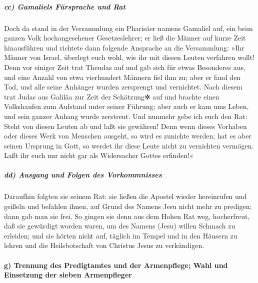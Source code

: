 \hypertarget{cc-gamaliels-fuxfcrsprache-und-rat}{%
\subparagraph{cc) Gamaliels Fürsprache und
Rat}\label{cc-gamaliels-fuxfcrsprache-und-rat}}

 Doch da stand in der Versammlung ein Pharisäer namens
Gamaliel auf, ein beim ganzen Volk hochangesehener Gesetzeslehrer; er
ließ die Männer auf kurze Zeit hinausführen  und richtete
dann folgende Ansprache an die Versammlung: »Ihr Männer von Israel,
überlegt euch wohl, wie ihr mit diesen Leuten verfahren wollt!
 Denn vor einiger Zeit trat Theudas auf und gab sich für
etwas Besonderes aus, und eine Anzahl von etwa vierhundert Männern fiel
ihm zu; aber er fand den Tod, und alle seine Anhänger wurden zersprengt
und vernichtet.  Nach diesem trat Judas aus Galiläa zur
Zeit der Schätzung✲ auf und brachte einen Volkshaufen zum Aufstand unter
seiner Führung; aber auch er kam ums Leben, und sein ganzer Anhang wurde
zerstreut.  Und nunmehr gebe ich euch den Rat: Steht von
diesen Leuten ab und laßt sie gewähren! Denn wenn dieses Vorhaben oder
dieses Werk von Menschen ausgeht, so wird es zunichte werden;
 hat es aber seinen Ursprung in Gott, so werdet ihr diese
Leute nicht zu vernichten vermögen. Laßt ihr euch nur nicht gar als
Widersacher Gottes erfinden!«

\hypertarget{dd-ausgang-und-folgen-des-vorkommnisses}{%
\subparagraph{dd) Ausgang und Folgen des
Vorkommnisses}\label{dd-ausgang-und-folgen-des-vorkommnisses}}

Daraufhin folgten sie seinem Rat:  sie ließen die Apostel
wieder hereinrufen und geißeln und befahlen ihnen, auf Grund des Namens
Jesu nicht mehr zu predigen; dann gab man sie frei.  So
gingen sie denn aus dem Hohen Rat weg, hocherfreut, daß sie gewürdigt
worden waren, um des Namens (Jesu) willen Schmach zu erleiden;
 und sie hörten nicht auf, täglich im Tempel und in den
Häusern zu lehren und die Heilsbotschaft von Christus Jesus zu
verkündigen.

\hypertarget{g-trennung-des-predigtamtes-und-der-armenpflege-wahl-und-einsetzung-der-sieben-armenpfleger}{%
\paragraph{g) Trennung des Predigtamtes und der Armenpflege; Wahl und
Einsetzung der sieben
Armenpfleger}\label{g-trennung-des-predigtamtes-und-der-armenpflege-wahl-und-einsetzung-der-sieben-armenpfleger}}

